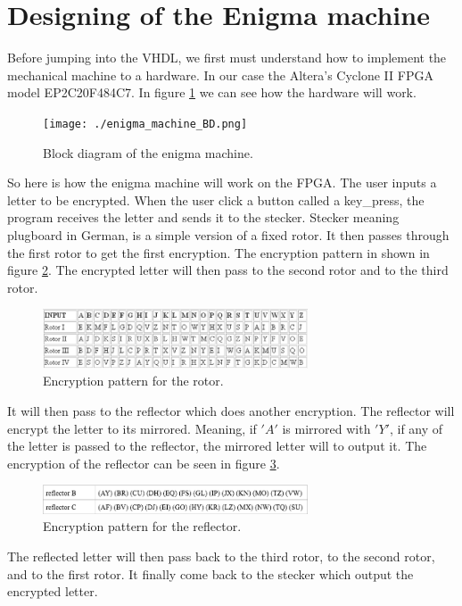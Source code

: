 \documentclass[10pt]{article}
\begin{document}
\section{Designing of the Enigma machine}
Before jumping into the VHDL, we first must understand how to implement the mechanical machine to a hardware. In our case the Altera's Cyclone II FPGA model EP2C20F484C7. In figure \ref{fig:enigma_machine_BD} we can see how the hardware will work.\\
\begin{figure}[!htb]
    \centering
    \texttt{[image: ./enigma\_machine\_BD.png]}
    \caption{Block diagram of the enigma machine.}
    \label{fig:enigma_machine_BD}
\end{figure}
So here is how the enigma machine will work on the FPGA. The user inputs a letter to be encrypted. When the user click a button called a key\_press, the program receives the letter and sends it to the stecker. Stecker meaning plugboard in German, is a simple version of a fixed rotor. It then passes through the first rotor to get the first encryption. The encryption pattern in shown in figure \ref{fig:rotor_encryption}. The encrypted letter will then pass to the second rotor and to the third rotor.\\
\begin{figure}[!htb]
    \centering
    \includegraphics[width=0.7\textwidth]{./rotor_encryption.png}
    \caption{Encryption pattern for the rotor.}
    \label{fig:rotor_encryption}
\end{figure}
It will then pass to the reflector which does another encryption. The reflector will encrypt the letter to its mirrored. Meaning, if $'A'$ is mirrored with $'Y'$, if any of the letter is passed to the reflector, the mirrored letter will to output it. The encryption of the reflector can be seen in figure \ref{fig:reflector_encryption}.\\
\begin{figure}[!htb]
    \centering
    \includegraphics[width=0.7\textwidth]{./reflector_encryption.png}
    \caption{Encryption pattern for the reflector.}
    \label{fig:reflector_encryption}
\end{figure}
The reflected letter will then pass back to the third rotor, to the second rotor, and to the first rotor. It finally come back to the stecker which output the encrypted letter.\\ 
\end{document}
